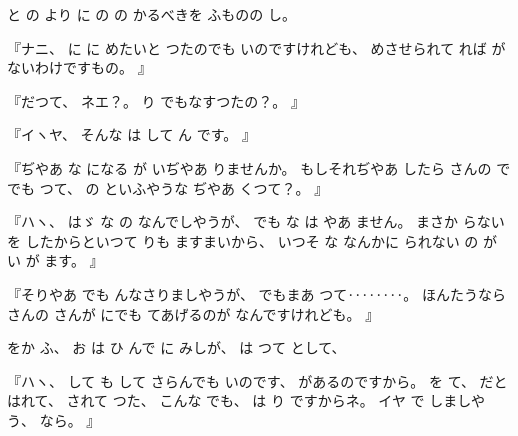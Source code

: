%
と
の
より
に
の
の
かるべきを
ふものの
し。

%
『ナニ、
%
に
に
めたいと
つたのでも
いのですけれども、
%
めさせられて
れば
がないわけですもの。
』

%
『だつて、
%
ネエ？。
%
り
でもなすつたの？。
』

%
『イヽヤ、
%
そんな
は
して
ん
です。
』

%
『ぢやあ
な
になる
が
いぢやあ
りませんか。
%
もしそれぢやあ
したら
さんの
で
でも
つて、
%
の
といふやうな
ぢやあ
くつて？。
』

%
『ハヽ、
%
はゞ
な
の
なんでしやうが、
%
でも
な
は
やあ
ません。
%
まさか
らない
を
したからといつて
りも
ますまいから、
%
いつそ
な
なんかに
られない
の
が
い
が
ます。
』

%
『そりやあ
でも
んなさりましやうが、
%
でもまあ
つて‥‥‥‥。
%
ほんたうなら
さんの
さんが
にでも
てあげるのが
なんですけれども。
』

%
をか
ふ、
%
お
は
ひ
んで
に
みしが、
%
は
つて
として、

%
『ハヽ、
%
して
も
して
さらんでも
いのです、
%
があるのですから。
%
を
て、
%
だと
はれて、
%
されて
つた、
%
こんな
でも、
%
は
り
ですからネ。
%
イヤ
で
しましやう、
%
なら。
』

